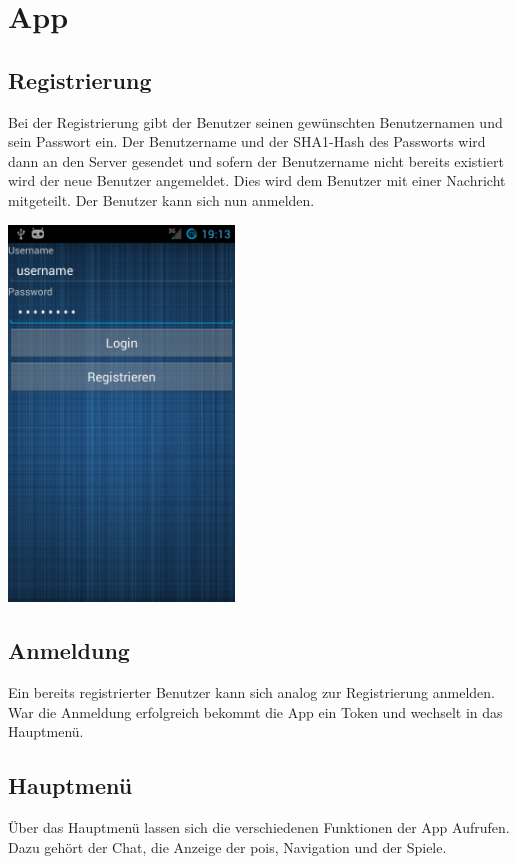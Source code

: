 \chapter{App}
\section{Registrierung}
Bei der Registrierung gibt der Benutzer seinen gewünschten Benutzernamen und sein Passwort ein. Der Benutzername und der SHA1-Hash des Passworts wird dann an den Server gesendet und sofern der Benutzername nicht bereits existiert wird der neue Benutzer angemeldet. Dies wird dem Benutzer mit einer Nachricht mitgeteilt. Der Benutzer kann sich nun anmelden.

\begin{capfigure}
	\includegraphics[width=6cm]{images/app/login}
\end{capfigure}


\section{Anmeldung}
Ein bereits registrierter Benutzer kann sich analog zur Registrierung anmelden. War die Anmeldung erfolgreich bekommt die App ein Token und wechselt in das Hauptmenü.

\section{Hauptmenü}
Über das Hauptmenü lassen sich die verschiedenen Funktionen der App Aufrufen. Dazu gehört der Chat, die Anzeige der \glspl{poi}, Navigation und der Spiele.

